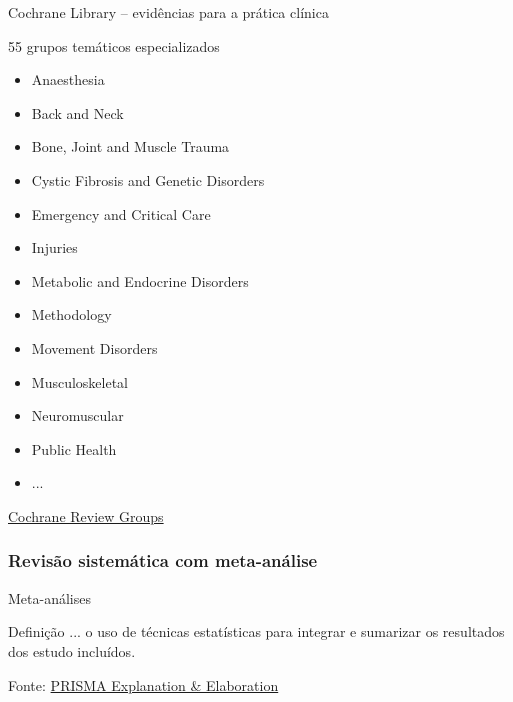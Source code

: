 \documentclass{beamer}
\begin{document}
\begin{frame}{\footnotesize Cochrane Library -- evidências para a prática clínica}
  \begin{block}{55 grupos temáticos especializados}
    \begin{center}
      \begin{itemize}
        \tiny
      \item Anaesthesia
      \item Back and Neck
      \item Bone, Joint and Muscle Trauma
      \item Cystic Fibrosis and Genetic Disorders
      \item Emergency and Critical Care
      \item Injuries
      \item Metabolic and Endocrine Disorders
      \item Methodology
      \item Movement Disorders
      \item Musculoskeletal
      \item Neuromuscular
      \item Public Health
      \item ...
      \end{itemize}
    \end{center}
  \end{block}

  \vfill
  \scriptsize
  \hfill\href{https://www.cochranelibrary.com/about/cochrane-review-groups}{Cochrane Review Groups}
\end{frame}

\subsubsection[Meta-análise]{Revisão sistemática com meta-análise}

\begin{frame}{Meta-análises}
  \begin{block}{Definição}
    \footnotesize
    ... o uso de técnicas estatísticas para integrar e sumarizar os resultados dos estudo incluídos.
  \end{block}

  \vfill
  \scriptsize
  \hfill Fonte: \href{https://doi.org/10.1371/journal.pmed.1000100}
  {\tiny PRISMA Explanation \& Elaboration}
\end{frame}
\end{document}
